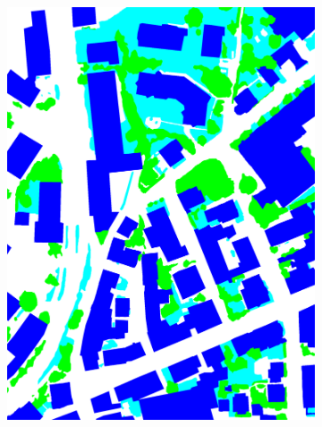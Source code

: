 \begin{figure}[htb]
\begin{subfigure}{0.19\textwidth}
  \includegraphics[width=1\linewidth]{fig/vai/1_gt.png}
\end{subfigure}



\end{figure}

